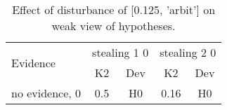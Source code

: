 \begin{table}\begin{tabular}{l|cc|cc}\toprule\multirow{2}{*}{Evidence} & \multicolumn{2}{c}{stealing 1 0}& \multicolumn{2}{c}{stealing 2 0}\\& {K2} & {Dev}& {K2} & {Dev}\\\midrule
no evidence, 0 & \cellcolor{Bittersweet}0.5&\cellcolor{Bittersweet}H0&\cellcolor{Bittersweet}0.16&\cellcolor{Bittersweet}H0\\\bottomrule\end{tabular}\caption{Effect of disturbance of [0.125, 'arbit'] on weak view of hypotheses.}\end{table}